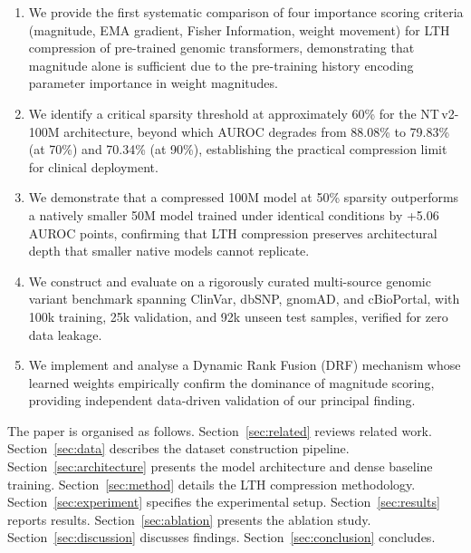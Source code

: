 \documentclass[journal]{IEEEtran}
\newcommand{\ntv}{NT\,v2-100M}
\begin{document}
\begin{enumerate}
  \item We provide the first systematic comparison of four
        importance scoring criteria (magnitude, EMA gradient,
        Fisher Information, weight movement) for LTH
        compression of pre-trained genomic transformers,
        demonstrating that magnitude alone is sufficient due
        to the pre-training history encoding parameter
        importance in weight magnitudes.

  \item We identify a critical sparsity threshold at
        approximately 60\% for the \ntv{} architecture,
        beyond which AUROC degrades from 88.08\%
        to 79.83\% (at 70\%) and 70.34\% (at 90\%),
        establishing the practical compression limit for
        clinical deployment.

  \item We demonstrate that a compressed 100M model at 50\%
        sparsity outperforms a natively smaller 50M model
        trained under identical conditions by +5.06 AUROC
        points, confirming that LTH compression preserves
        architectural depth that smaller native models
        cannot replicate.

  \item We construct and evaluate on a rigorously curated
        multi-source genomic variant benchmark spanning
        ClinVar, dbSNP, gnomAD, and cBioPortal, with 100k
        training, 25k validation, and 92k unseen test samples,
        verified for zero data leakage.

  \item We implement and analyse a Dynamic Rank Fusion (DRF)
        mechanism whose learned weights empirically confirm
        the dominance of magnitude scoring, providing
        independent data-driven validation of our principal
        finding.
\end{enumerate}

The paper is organised as follows.
Section~\ref{sec:related} reviews related work.
Section~\ref{sec:data} describes the dataset construction
pipeline.
Section~\ref{sec:architecture} presents the model architecture
and dense baseline training.
Section~\ref{sec:method} details the LTH compression
methodology.
Section~\ref{sec:experiment} specifies the experimental setup.
Section~\ref{sec:results} reports results.
Section~\ref{sec:ablation} presents the ablation study.
Section~\ref{sec:discussion} discusses findings.
Section~\ref{sec:conclusion} concludes.
\end{document}
